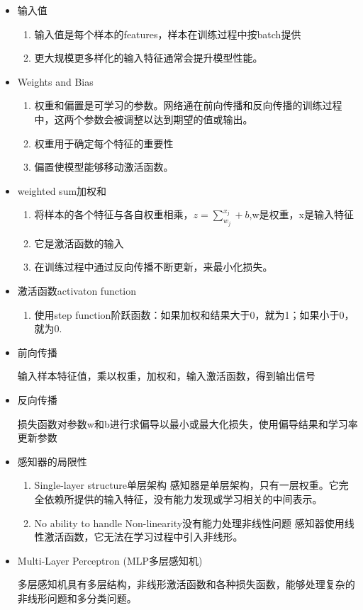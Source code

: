 \documentclass[UTF8]{ctexart}
\begin{document}
\begin{itemize}
    \item 输入值
    \begin{enumerate}
        \item 输入值是每个样本的features，样本在训练过程中按batch提供
        \item 更大规模更多样化的输入特征通常会提升模型性能。
    \end{enumerate}
    \item Weights and Bias
    \begin{enumerate}
        \item 权重和偏置是可学习的参数。网络通在前向传播和反向传播的训练过程中，这两个参数会被调整以达到期望的值或输出。
        \item 权重用于确定每个特征的重要性
        \item 偏置使模型能够移动激活函数。
    \end{enumerate}
    \item weighted sum加权和
    \begin{enumerate}
        \item 将样本的各个特征与各自权重相乘，$z=\sum_{w_j}^{x_j}+b$,w是权重，x是输入特征
        \item 它是激活函数的输入
        \item 在训练过程中通过反向传播不断更新，来最小化损失。
    \end{enumerate}
    \item 激活函数activaton function
    \begin{enumerate}
        \item 使用step function阶跃函数：如果加权和结果大于0，就为1；如果小于0，就为0.
    \end{enumerate}
    \item 前向传播
    
    输入样本特征值，乘以权重，加权和，输入激活函数，得到输出信号

    \item 反向传播
    
    损失函数对参数w和b进行求偏导以最小或最大化损失，使用偏导结果和学习率更新参数

    \item 感知器的局限性
    \begin{enumerate}
        \item Single-layer structure单层架构
        感知器是单层架构，只有一层权重。它完全依赖所提供的输入特征，没有能力发现或学习相关的中间表示。
        \item No ability to handle Non-linearity没有能力处理非线性问题
        感知器使用线性激活函数，它无法在学习过程中引入非线形。
    \end{enumerate}

    \item Multi-Layer Perceptron (MLP多层感知机)
    
    多层感知机具有多层结构，非线形激活函数和各种损失函数，能够处理复杂的非线形问题和多分类问题。
\end{itemize}
\end{document}
